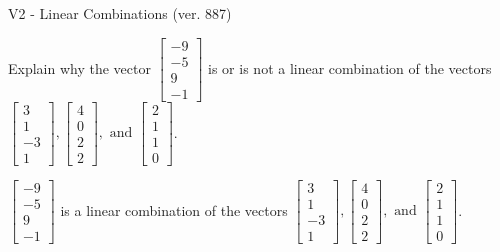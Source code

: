\begin{exercise}
  \begin{exerciseTitle}V2 - Linear Combinations (ver. 887)\end{exerciseTitle}
  \begin{exerciseStatement}
    Explain why the vector \(\left[\begin{array}{c}
-9 \\
-5 \\
9 \\
-1
\end{array}\right]\)  is or is not a linear 
	combination of the vectors \(\left[\begin{array}{c}
3 \\
1 \\
-3 \\
1
\end{array}\right] , \left[\begin{array}{c}
4 \\
0 \\
2 \\
2
\end{array}\right] , \text{ and } \left[\begin{array}{c}
2 \\
1 \\
1 \\
0
\end{array}\right]\).
	


  \end{exerciseStatement}
  \begin{exerciseAnswer}
   \(\left[\begin{array}{c}
-9 \\
-5 \\
9 \\
-1
\end{array}\right]\) 
  	 is  
	a linear combination of the vectors \(\left[\begin{array}{c}
3 \\
1 \\
-3 \\
1
\end{array}\right] , \left[\begin{array}{c}
4 \\
0 \\
2 \\
2
\end{array}\right] , \text{ and } \left[\begin{array}{c}
2 \\
1 \\
1 \\
0
\end{array}\right]\).

	
  


  \end{exerciseAnswer}
\end{exercise}